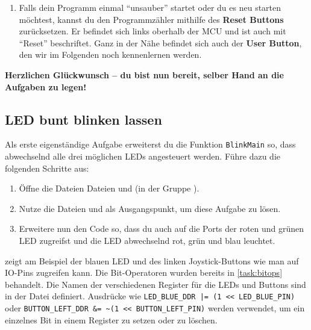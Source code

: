 \begin{enumerate}
\item 
Falls dein Programm einmal \enquote{unsauber} startet oder du es neu starten möchtest, kannst du den Programmzähler mithilfe des \textbf{Reset Buttons} zurücksetzen.
Er befindet sich links oberhalb der MCU und ist auch mit \enquote{Reset} beschriftet.
Ganz in der Nähe befindet sich auch der \textbf{User Button}, den wir im Folgenden noch kennenlernen werden.
\end{enumerate}

\noindent\textbf{Herzlichen Glückwunsch -- du bist nun bereit, selber Hand an die Aufgaben zu legen!}

\subsection{LED bunt blinken lassen}
Als erste eigenständige Aufgabe erweiterst du die Funktion \lstinline|BlinkMain| so, dass abwechselnd alle drei möglichen LEDs angesteuert werden.
Führe dazu die folgenden Schritte aus:
\begin{enumerate}
\item 
Öffne die Dateien Dateien  und  (in der Gruppe ).

\item 
Nutze die Dateien  und  als Ausgangspunkt, um diese Aufgabe zu lösen.
\item
Erweitere nun den Code so, dass du auch auf die Ports der roten und grünen LED zugreifst und die LED abwechselnd rot, grün und blau leuchtet.
\end{enumerate}

 zeigt am Beispiel der blauen LED und des linken Joystick-Buttons wie man auf IO-Pins zugreifen kann.
Die Bit-Operatoren wurden bereits in \ref{task:bitops} behandelt.
Die Namen der verschiedenen Register für die LEDs und Buttons sind in der Datei  definiert.
Ausdrücke wie \lstinline{LED_BLUE_DDR |= (1 << LED_BLUE_PIN)} oder \lstinline{BUTTON_LEFT_DDR &= ~(1 << BUTTON_LEFT_PIN)} werden verwendet, um ein einzelnes Bit in einem Register zu setzen oder zu löschen.
%
%
